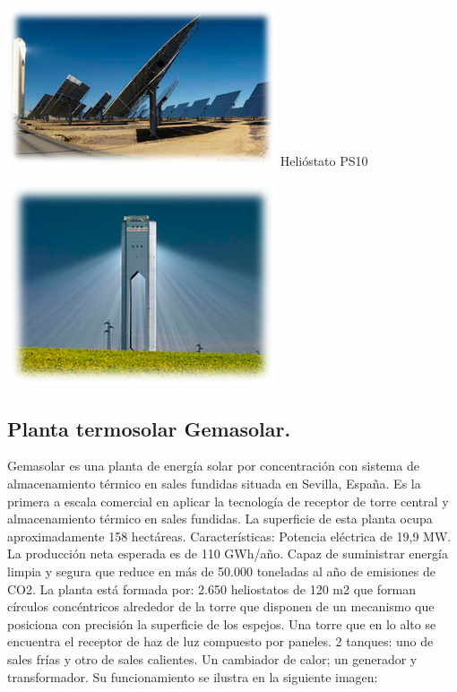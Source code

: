 \includegraphics[scale=1]{unnamed (2).png}
Helióstato PS10

\includegraphics[scale=1]{unnamed (3).png}
\cite{ValenticampderrosWebSite}

\subsection{Planta termosolar Gemasolar.}

Gemasolar es una planta de energía solar por concentración con sistema de almacenamiento térmico en sales fundidas situada en Sevilla, España. Es la primera a escala comercial en aplicar la tecnología de receptor de torre central y almacenamiento térmico en sales fundidas. La superficie de esta planta ocupa aproximadamente 158 hectáreas. Características:
Potencia eléctrica de 19,9 MW.
La producción neta esperada es de 110 GWh/año.
Capaz de suministrar energía limpia y segura que reduce en más de 50.000 toneladas al año de emisiones de CO2.
La planta está formada por:
2.650 heliostatos de 120 m2 que forman círculos concéntricos alrededor de la torre que disponen de un mecanismo que posiciona con precisión la superficie de los espejos.
Una torre que en lo alto se encuentra el receptor de haz de luz compuesto por paneles.
2 tanques: uno de sales frías y otro de sales calientes.
Un cambiador de calor; un generador y transformador.
Su funcionamiento se ilustra en la siguiente imagen:


